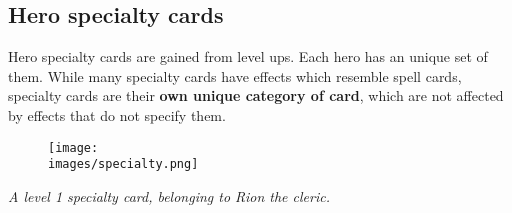 \subsection*{\hypertarget{Specialty}{Hero specialty cards}}
Hero specialty cards are gained from level ups.
Each hero has an unique set of them.
While many specialty cards have effects which resemble spell cards, specialty cards are their \textbf{own unique category of card}, which are not affected by effects that do not specify them.
\par

\begin{figure}[h]
\centering
\texttt{[image: \\images/specialty.png]}
\end{figure}
\begin{center}
\textit{A level 1 specialty card, belonging to Rion the cleric.}
\end{center}
